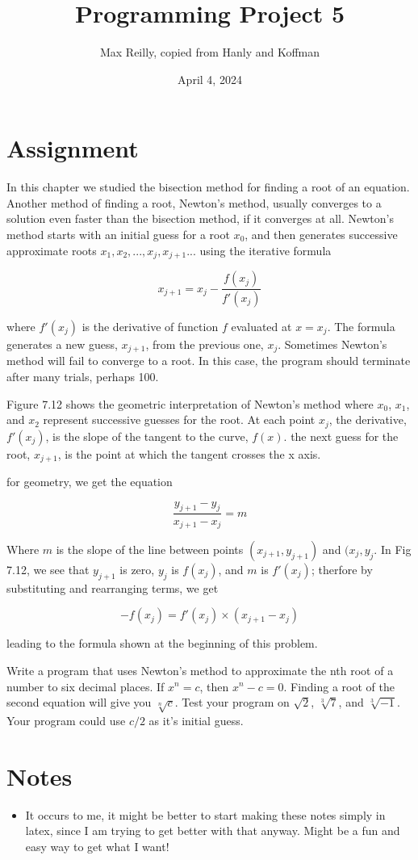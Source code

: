 \documentclass{article}
\title{Programming Project 5}
\author{Max Reilly, copied from Hanly and Koffman}
\date{April 4, 2024}
\begin{document}
\maketitle
\section{Assignment}
In this chapter we studied the bisection method for finding a root of an equation. Another method of
finding a root, Newton's method, usually converges to a solution even faster than the bisection
method, if it converges at all. Newton's method starts with an initial guess for a root $x_0$, and
then generates successive approximate roots $x_1, x_2, . . . , x_j, x_{j+1} . . .$ using the iterative
formula

$$
x_{j+1} = x_j - \frac{f(x_j)}{f'(x_j)}
$$

where $f'(x_j)$ is the derivative of function $f$ evaluated at $x = x_j$. The formula generates a new
guess, $x_{j+1}$, from the previous one, $x_{j}$. Sometimes Newton's method will fail to converge to
a root. In this case, the program should terminate after many trials, perhaps 100.

Figure 7.12 shows the geometric interpretation of Newton's method where $x_0$, $x_1$, and $x_2$
represent successive guesses for the root. At each point $x_j$, the derivative, $f'(x_j)$, is the
slope of the tangent to the curve, $f(x)$. the next guess for the root, $x_{j+1}$, is the point at
which the tangent crosses the x axis.

for geometry, we get the equation

$$
\frac{y_{j+1} - y_j}{x_{j+1} - x_j} = m
$$


Where $m$ is the slope of the line between points $(x_{j+1}, y_{j+1})$ and $(x_j, y_j$. In Fig 7.12,
we see that $y_{j+1}$ is zero, $y_j$ is $f(x_j)$, and $m$ is $f'(x_j)$; therfore by substituting and
rearranging terms, we get

$$
-f(x_j) = f'(x_j) \times (x_{j+1} - x_j)
$$

leading to the formula shown at the beginning of this problem.

Write a program that uses Newton's method to approximate the nth root of a number to six decimal
places. If $x^n = c$, then $x^n -c = 0$. Finding a root of the second equation will give you
$\sqrt[n]{c}$. Test your program on $\sqrt{2}$, $\sqrt[3]{7}$, and $\sqrt[3]{-1}$. Your program could
use $c/2$ as it's initial guess.

\section{Notes}
\begin{itemize}
    \item It occurs to me, it might be better to start making these notes simply in latex, since I am
            trying to get better with that anyway. Might be a fun and easy way to get what I want!
\end{itemize}
\end{document}
